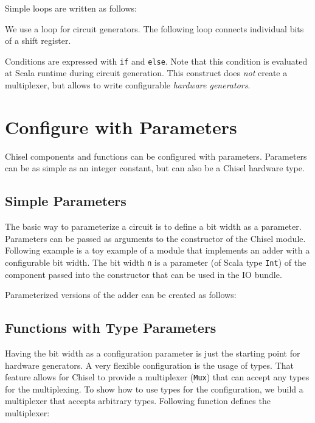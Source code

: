 \documentclass[%
    10pt,
    headinclude, footexclude,
    openright, %
    notitlepage,
    cleardoubleempty,
    headsepline,
    pointlessnumbers,
    bibtotoc, idxtotoc,
    ]{scrbook}
\newcommand{\code}[1]{{\small{\texttt{#1}}}}
\begin{document}

Simple loops are written as follows:


We use a loop for circuit generators. The following loop connects individual bits
of a shift register.


Conditions are expressed with \code{if} and \code{else}. Note that this condition
is evaluated at Scala runtime during circuit generation. This construct does \emph{not}
create a multiplexer, but allows to write configurable \emph{hardware generators}.






\section{Configure with Parameters}

Chisel components and functions can be configured with parameters.
Parameters can be as simple as an integer constant, but can also be a Chisel
hardware type.

\subsection{Simple Parameters}

The basic way to parameterize a circuit is to define a bit width as a parameter.
Parameters can be passed as arguments to
the constructor of the Chisel module. Following example is a toy example of
a module that implements an adder with a configurable bit width.
The bit width \code{n} is a parameter (of Scala type \code{Int}) of the component
passed into the constructor that can be used in the IO bundle.


\noindent Parameterized versions of the adder can be created as follows:


\subsection{Functions with Type Parameters}

Having the bit width as a configuration parameter is just the starting point for
hardware generators. A very flexible configuration is the usage of types.
That feature allows for Chisel to provide a multiplexer (\code{Mux}) that
can accept any types for the multiplexing.
To show how to use types for the configuration, we build a multiplexer
that accepts arbitrary types. Following function defines the multiplexer:
\end{document}
